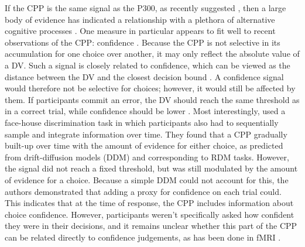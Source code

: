If the CPP is the same signal as the P300, as recently suggested  \parencite{Twomey2015}, then a large body of evidence has indicated a relationship with a plethora of alternative cognitive processes \parencite{Nieuwenhuis2011,Nieuwenhuis2005}. One measure in particular appears to fit well to recent observations of the CPP: confidence \parencite{Hillyard1971,Squires1973}. Because the CPP is not selective in its accumulation for one choice over another, it may only reflect the absolute value of a DV. Such a signal is closely related to confidence, which can be viewed as the distance between the DV and the closest decision bound \parencite{Urai2014}. A confidence signal would therefore not be selective for choices; however, it would still be affected by them. If participants commit an error, the DV should reach the same threshold as in a correct trial, while confidence should be lower \parencite{Shadlen2013}. Most interestingly, \textcite{Philiastides2014} used a face-house discrimination task in which participants also had to sequentially sample and integrate information over time. They found that a CPP gradually built-up over time with the amount of evidence for either choice, as predicted from drift-diffusion models (DDM) and corresponding to RDM tasks. However, the signal did not reach a fixed threshold, but was still modulated by the amount of evidence for a choice. Because a simple DDM could not account for this, the authors demonstrated that adding a proxy for confidence on each trial could. This indicates that at the time of response, the CPP includes information about choice confidence. However, participants weren’t specifically asked how confident they were in their decisions, and it remains unclear whether this part of the CPP can be related directly to confidence judgements, as has been done in fMRI \parencite[e.g.,][]{Hebart2016}.

